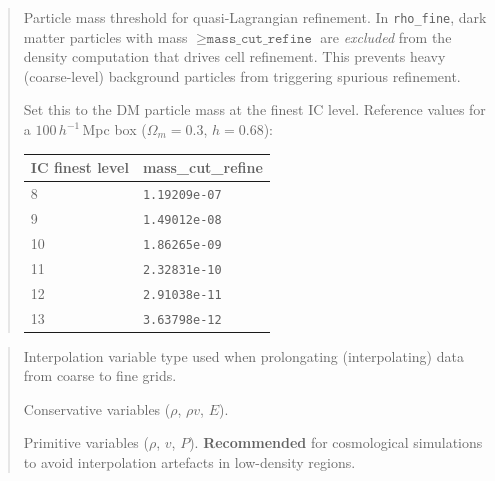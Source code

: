 \label{param:mass_cut_refine}

\begin{quote}
Particle mass threshold for quasi-Lagrangian refinement.  In
\texttt{rho\_fine}, dark matter particles with mass
$\geq \texttt{mass\_cut\_refine}$ are \emph{excluded} from the
density computation that drives cell refinement.  This prevents
heavy (coarse-level) background particles from triggering spurious
refinement.

Set this to the DM particle mass at the finest IC level.  Reference
values for a $100\,h^{-1}\,$Mpc box
($\Omega_m = 0.3$, $h = 0.68$):

\begin{center}
\small
\begin{tabular}{@{}ll@{}}
\toprule
\textbf{IC finest level} & \textbf{mass\_cut\_refine} \\
\midrule
8  & \texttt{1.19209e-07} \\
9  & \texttt{1.49012e-08} \\
10 & \texttt{1.86265e-09} \\
11 & \texttt{2.32831e-10} \\
12 & \texttt{2.91038e-11} \\
13 & \texttt{3.63798e-12} \\
\bottomrule
\end{tabular}
\end{center}

\end{quote}

\label{param:interpol_var}

\begin{quote}
Interpolation variable type used when prolongating (interpolating)
data from coarse to fine grids.
\begin{description}[style=nextline,leftmargin=1.5cm,font=\ttfamily]
  \item[0] Conservative variables ($\rho$, $\rho v$, $E$).
  \item[1] Primitive variables ($\rho$, $v$, $P$).
        \textbf{Recommended} for cosmological simulations to avoid
        interpolation artefacts in low-density regions.
\end{description}
\end{quote}


